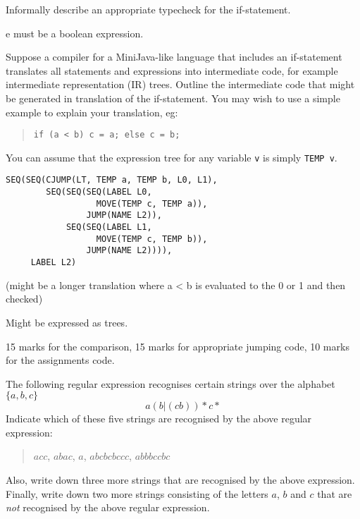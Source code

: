 \documentclass[11pt]{bareexam}
\begin{document}
\begin{questions}
\begin{subquestions}
\begin{subsubquestions}
\subsubquestion
Informally describe an appropriate typecheck for the if-statement.

\begin{modelanswer}
e must be a boolean expression.
\end{modelanswer}

\subsubquestion

Suppose a compiler for a MiniJava-like language that includes
an if-statement translates all statements and expressions
into intermediate code, for example intermediate representation (IR) trees.
Outline the intermediate code that might be generated
in translation of the if-statement. You may wish to use a simple
example to explain your translation, eg:
\begin{quote}
\begin{verbatim}
if (a < b) c = a; else c = b;
\end{verbatim}
\end{quote}
You can assume that the expression tree for any variable \verb"v" is
simply \verb"TEMP v". 

\begin{modelanswer}
\begin{verbatim}
SEQ(SEQ(CJUMP(LT, TEMP a, TEMP b, L0, L1),
        SEQ(SEQ(SEQ(LABEL L0,
                  MOVE(TEMP c, TEMP a)),
                JUMP(NAME L2)),
            SEQ(SEQ(LABEL L1,
                  MOVE(TEMP c, TEMP b)),
                JUMP(NAME L2)))),
     LABEL L2)
\end{verbatim}
(might be a longer translation where a < b is evaluated to 
the 0 or 1 and then checked)

Might be expressed as trees.

15 marks for the comparison, 15 marks for appropriate jumping code, 10
marks for the assignments code.
\end{modelanswer}

\end{subsubquestions}

\end{subquestions}

\newpage

\question

\begin{subquestions}

\subquestion
The following regular expression recognises certain strings over the
alphabet $\{a,b,c\}$
\[
a(b|(cb))\!*c*
\]
Indicate which of these five strings are recognised by the above regular expression:
\begin{quote}
$acc$, $abac$, $a$, $abcbcbccc$, $abbbccbc$
\end{quote}
Also, write down three more strings that are recognised by the above expression.
Finally, write down two more strings consisting of 
the letters $a$, $b$ and $c$ that are \emph{not} 
recognised by the above regular expression.


\end{subquestions}
\end{questions}
\end{document}
